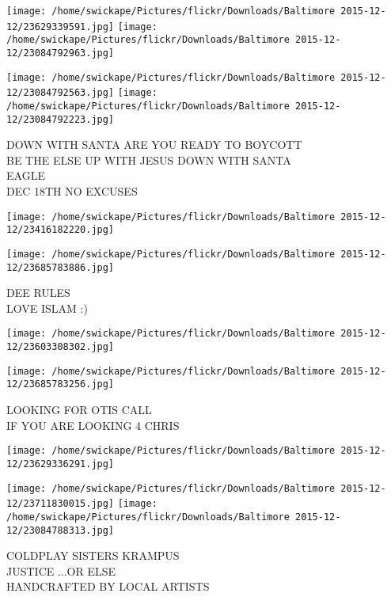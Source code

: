 \documentclass[10pt,letterpaper]{article}
\begin{document}
\texttt{[image: /home/swickape/Pictures/flickr/Downloads/Baltimore 2015-12-12/23629339591.jpg]}
\texttt{[image: /home/swickape/Pictures/flickr/Downloads/Baltimore 2015-12-12/23084792963.jpg]}

\texttt{[image: /home/swickape/Pictures/flickr/Downloads/Baltimore 2015-12-12/23084792563.jpg]}
\texttt{[image: /home/swickape/Pictures/flickr/Downloads/Baltimore 2015-12-12/23084792223.jpg]}

DOWN WITH SANTA ARE YOU READY TO BOYCOTT\\
BE THE ELSE UP WITH JESUS DOWN WITH SANTA\\
EAGLE\\
DEC 18TH NO EXCUSES\\
\pagebreak

\texttt{[image: /home/swickape/Pictures/flickr/Downloads/Baltimore 2015-12-12/23416182220.jpg]}

\vspace{0.25in}
\texttt{[image: /home/swickape/Pictures/flickr/Downloads/Baltimore 2015-12-12/23685783886.jpg]}

DEE RULES\\
LOVE ISLAM :)\\
\pagebreak

\texttt{[image: /home/swickape/Pictures/flickr/Downloads/Baltimore 2015-12-12/23603308302.jpg]}

\vspace{0.25in}
\texttt{[image: /home/swickape/Pictures/flickr/Downloads/Baltimore 2015-12-12/23685783256.jpg]}

LOOKING FOR OTIS CALL\\
IF YOU ARE LOOKING 4 CHRIS\\
\pagebreak

\texttt{[image: /home/swickape/Pictures/flickr/Downloads/Baltimore 2015-12-12/23629336291.jpg]}

\vspace{0.25in}
\texttt{[image: /home/swickape/Pictures/flickr/Downloads/Baltimore 2015-12-12/23711830015.jpg]}
\texttt{[image: /home/swickape/Pictures/flickr/Downloads/Baltimore 2015-12-12/23084788313.jpg]}

COLDPLAY SISTERS KRAMPUS\\
JUSTICE ...OR ELSE\\
HANDCRAFTED BY LOCAL ARTISTS\\
\pagebreak
\end{document}
